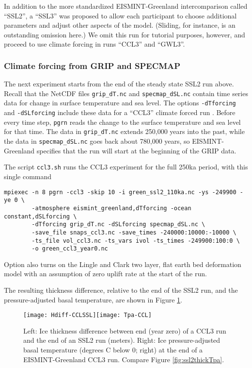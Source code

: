 In addition to the more standardized EISMINT-Greenland intercomparison called ``SSL2'', a ``SSL3'' was proposed to allow each participant to choose additional parameters and adjust other aspects of the model.  (Sliding, for instance, is an outstanding omission here.)  We omit this run for tutorial purposes, however, and proceed to use climate forcing in runs ``CCL3'' and ``GWL3''.


\subsubsection*{Climate forcing from GRIP and SPECMAP} 
\label{sec:climate-forcing}
The next experiment starts from the end of the steady state SSL2 run above.  Recall that the NetCDF files \texttt{grip_dT.nc} and \texttt{specmap_dSL.nc} contain time series data for change in surface temperature and sea level.  The options \texttt{-dTforcing} and \texttt{-dSLforcing} include these data for a ``CCL3'' climate forced run \cite{RitzEISMINT,HuybrechtsEISMINT}.  Before every time step, \texttt{pgrn} reads the change to the surface temperature and sea level for that time.  The data in \texttt{grip_dT.nc} extends 250,000 years into the past, while the data in \texttt{specmap_dSL.nc} goes back about 780,000 years, so EISMINT-Greenland specifies that the run will start at the beginning of the GRIP data.  

The script \texttt{ccl3.sh} runs the CCL3 experiment for the full 250ka period, with this single command
\begin{verbatim}
mpiexec -n 8 pgrn -ccl3 -skip 10 -i green_ssl2_110ka.nc -ys -249900 -ye 0 \
        -atmosphere eismint_greenland,dTforcing -ocean constant,dSLforcing \
        -dTforcing grip_dT.nc -dSLforcing specmap_dSL.nc \
        -save_file snaps_ccl3.nc -save_times -240000:10000:-10000 \
        -ts_file vol_ccl3.nc -ts_vars ivol -ts_times -249900:100:0 \
        -o green_ccl3_year0.nc
\end{verbatim}
\noindent Option \intextoption{ccl3} also turns on the Lingle and Clark \cite{BLKfastearth,LingleClark} two layer, flat earth bed deformation model with an assumption of zero uplift rate at the start of the run.

The resulting thickness difference, relative to the end of the SSL2 run, and the pressure-adjusted basal temperature, are shown in Figure \ref{fig:cclthickTpa}.

\begin{figure}[ht]
\centering
\texttt{[image: Hdiff-CCLSSL]}\quad\texttt{[image: Tpa-CCL]}
\caption{Left:  Ice thickness difference between end (year zero) of a CCL3 run and the end of an SSL2 run (meters).  Right:  Ice pressure-adjusted basal temperature (degrees C below 0; right) at the end of a EISMINT-Greenland CCL3 run.  Compare Figure \ref{fig:ssl2thickTpa}.}
\label{fig:cclthickTpa}
\end{figure}

